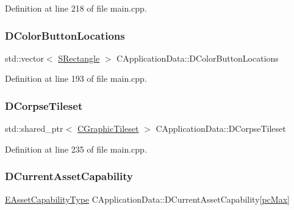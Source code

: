 Definition at line 218 of file main.\+cpp.

\hypertarget{classCApplicationData_ac983034ed6e3eec382e22f1d2af25106}{}\label{classCApplicationData_ac983034ed6e3eec382e22f1d2af25106} 
\subsubsection{\texorpdfstring{D\+Color\+Button\+Locations}{DColorButtonLocations}}
{\footnotesize\ttfamily std\+::vector$<$ \hyperlink{structSRectangle}{S\+Rectangle} $>$ C\+Application\+Data\+::\+D\+Color\+Button\+Locations\hspace{0.3cm}{\ttfamily [protected]}}



Definition at line 193 of file main.\+cpp.

\hypertarget{classCApplicationData_aec983aa995cdb449344422d607fe0228}{}\label{classCApplicationData_aec983aa995cdb449344422d607fe0228} 
\subsubsection{\texorpdfstring{D\+Corpse\+Tileset}{DCorpseTileset}}
{\footnotesize\ttfamily std\+::shared\+\_\+ptr$<$ \hyperlink{classCGraphicTileset}{C\+Graphic\+Tileset} $>$ C\+Application\+Data\+::\+D\+Corpse\+Tileset\hspace{0.3cm}{\ttfamily [protected]}}



Definition at line 235 of file main.\+cpp.

\hypertarget{classCApplicationData_a7e0dbfdc54f73dfa9838ae81b8017e2d}{}\label{classCApplicationData_a7e0dbfdc54f73dfa9838ae81b8017e2d} 
\subsubsection{\texorpdfstring{D\+Current\+Asset\+Capability}{DCurrentAssetCapability}}
{\footnotesize\ttfamily \hyperlink{GameDataTypes_8h_a35b98ce26aca678b03c6f9f76e4778ce}{E\+Asset\+Capability\+Type} C\+Application\+Data\+::\+D\+Current\+Asset\+Capability\mbox{[}\hyperlink{GameDataTypes_8h_aafb0ca75933357ff28a6d7efbdd7602fa594a5c8dd3987f24e8a0f23f1a72cd34}{pc\+Max}\mbox{]}\hspace{0.3cm}{\ttfamily [protected]}}



